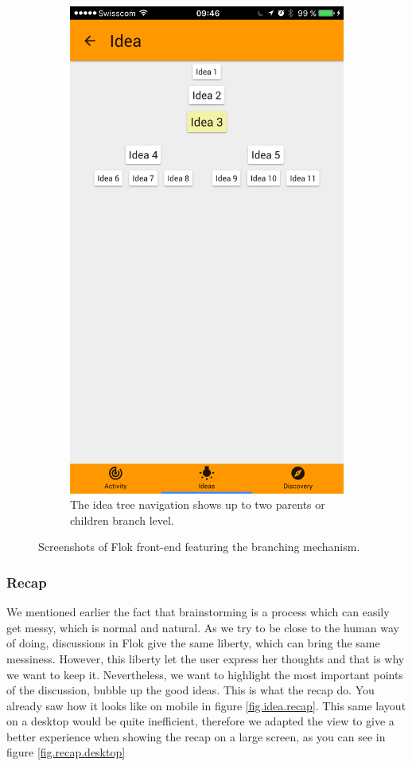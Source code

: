 \documentclass[a4paper,12pt, oneside]{article}
\begin{document}
\begin{figure}[!htb]
\begin{subfigure}[t]{.48\textwidth}
        \includegraphics[width=.67\textwidth]{images/branches_navigation.png}
        \caption{The idea tree navigation shows up to two parents or children branch level.}
    \end{subfigure}
    \caption{Screenshots of Flok front-end featuring the branching mechanism.}
    \label{fig.branches}
\end{figure}

\subsubsection{Recap}
\label{sec.recap}
We mentioned earlier the fact that brainstorming is a process which can easily get messy, which is normal and natural.
As we try to be close to the human way of doing, discussions in Flok give the same liberty, which can bring the same messiness.
However, this liberty let the user express her thoughts and that is why we want to keep it.
Nevertheless, we want to highlight the most important points of the discussion, bubble up the good ideas.
This is what the recap do.
You already saw how it looks like on mobile in figure \ref{fig.idea.recap}.
This same layout on a desktop would be quite inefficient, therefore we adapted the view to give a better experience when showing the recap on a large screen, as you can see in figure \ref{fig.recap.desktop}
\end{document}
